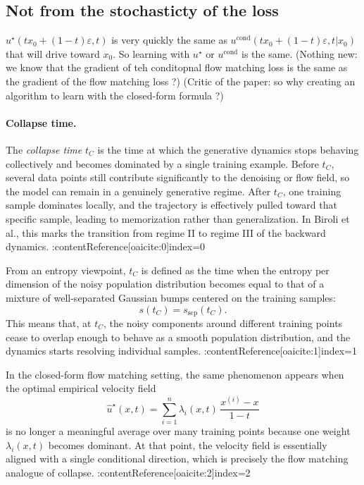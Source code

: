 \documentclass[10pt,a4paper]{article}
\theoremstyle{definition}
\begin{document}
\subsection{Not from the stochasticty of the loss}

$u^\star(tx_0+(1-t)\varepsilon, t)$ is very quickly the same as $u^{\text{cond}}(tx_0+(1-t)\varepsilon, t | x_0)$ that will drive toward $x_0$.
So learning with $u^\star$ or $u^{\text{cond}}$ is the same. (Nothing new: we know that the gradient of teh conditopnal flow matching loss is the same as the gradient of the flow matching loss ?)
(Critic of the paper: so why creating an algorithm to learn with the closed-form formula ?)


\paragraph{Collapse time.}
The \emph{collapse time} \(t_C\) is the time at which the generative dynamics stops behaving collectively and becomes dominated by a single training example. Before \(t_C\), several data points still contribute significantly to the denoising or flow field, so the model can remain in a genuinely generative regime. After \(t_C\), one training sample dominates locally, and the trajectory is effectively pulled toward that specific sample, leading to memorization rather than generalization. In Biroli et al., this marks the transition from regime II to regime III of the backward dynamics. :contentReference[oaicite:0]{index=0}

From an entropy viewpoint, \(t_C\) is defined as the time when the entropy per dimension of the noisy population distribution becomes equal to that of a mixture of well-separated Gaussian bumps centered on the training samples:
\[
s(t_C)=s_{\mathrm{sep}}(t_C).
\]
This means that, at \(t_C\), the noisy components around different training points cease to overlap enough to behave as a smooth population distribution, and the dynamics starts resolving individual samples. :contentReference[oaicite:1]{index=1}

In the closed-form flow matching setting, the same phenomenon appears when the optimal empirical velocity field
\[
\hat u^\star(x,t)=\sum_{i=1}^n \lambda_i(x,t)\,\frac{x^{(i)}-x}{1-t}
\]
is no longer a meaningful average over many training points because one weight \(\lambda_i(x,t)\) becomes dominant. At that point, the velocity field is essentially aligned with a single conditional direction, which is precisely the flow matching analogue of collapse. :contentReference[oaicite:2]{index=2}
\end{document}
